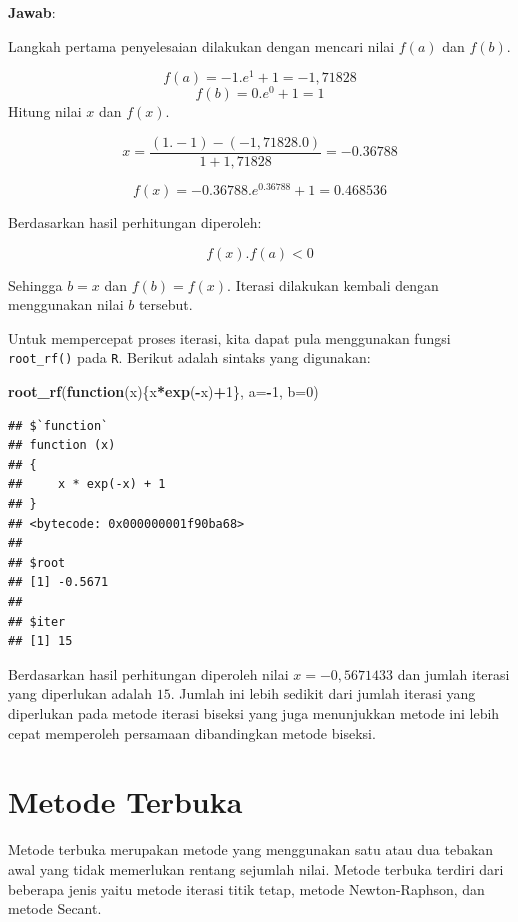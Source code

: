 \documentclass[]{book}
\newenvironment{Shaded}{\begin{snugshade}}{\end{snugshade}}
\newcommand{\ControlFlowTok}[1]{\textcolor[rgb]{0.13,0.29,0.53}{\textbf{#1}}}
\newcommand{\DataTypeTok}[1]{\textcolor[rgb]{0.13,0.29,0.53}{#1}}
\newcommand{\DecValTok}[1]{\textcolor[rgb]{0.00,0.00,0.81}{#1}}
\newcommand{\KeywordTok}[1]{\textcolor[rgb]{0.13,0.29,0.53}{\textbf{#1}}}
\newcommand{\NormalTok}[1]{#1}
\newcommand{\OperatorTok}[1]{\textcolor[rgb]{0.81,0.36,0.00}{\textbf{#1}}}
\theoremstyle{definition}
\theoremstyle{definition}
\theoremstyle{definition}
\theoremstyle{remark}
\begin{document}
\textbf{Jawab}:

Langkah pertama penyelesaian dilakukan dengan mencari nilai \(f\left(a \right)\) dan \(f\left(b \right)\).

\[
f\left(a \right)=-1.e^{1}+1=-1,71828
\]
\[
f\left(b \right)=0.e^{0}+1=1
\]
Hitung nilai \(x\) dan \(f\left(x \right)\).

\[
x=\frac{\left(1.-1\right)-\left(-1,71828.0\right)}{1+1,71828}=-0.36788
\]

\[
f\left(x \right)=-0.36788.e^{0.36788}+1=0.468536
\]

Berdasarkan hasil perhitungan diperoleh:

\[
f\left(x \right).f\left(a \right)<0
\]

Sehingga \(b=x\) dan \(f\left(b \right)=f\left(x \right)\). Iterasi dilakukan kembali dengan menggunakan nilai \(b\) tersebut.

Untuk mempercepat proses iterasi, kita dapat pula menggunakan fungsi \texttt{root\_rf()} pada \texttt{R}. Berikut adalah sintaks yang digunakan:

\begin{Shaded}
\begin{Highlighting}[]
\KeywordTok{root_rf}\NormalTok{(}\ControlFlowTok{function}\NormalTok{(x)\{x}\OperatorTok{*}\KeywordTok{exp}\NormalTok{(}\OperatorTok{-}\NormalTok{x)}\OperatorTok{+}\DecValTok{1}\NormalTok{\},}
               \DataTypeTok{a=}\OperatorTok{-}\DecValTok{1}\NormalTok{, }\DataTypeTok{b=}\DecValTok{0}\NormalTok{)}
\end{Highlighting}
\end{Shaded}

\begin{verbatim}
## $`function`
## function (x) 
## {
##     x * exp(-x) + 1
## }
## <bytecode: 0x000000001f90ba68>
## 
## $root
## [1] -0.5671
## 
## $iter
## [1] 15
\end{verbatim}

Berdasarkan hasil perhitungan diperoleh nilai \(x=-0,5671433\) dan jumlah iterasi yang diperlukan adalah \(15\). Jumlah ini lebih sedikit dari jumlah iterasi yang diperlukan pada metode iterasi biseksi yang juga menunjukkan metode ini lebih cepat memperoleh persamaan dibandingkan metode biseksi.

\hypertarget{openmethod}{%
\section{Metode Terbuka}\label{openmethod}}

Metode terbuka merupakan metode yang menggunakan satu atau dua tebakan awal yang tidak memerlukan rentang sejumlah nilai. Metode terbuka terdiri dari beberapa jenis yaitu metode iterasi titik tetap, metode Newton-Raphson, dan metode Secant.
\end{document}
